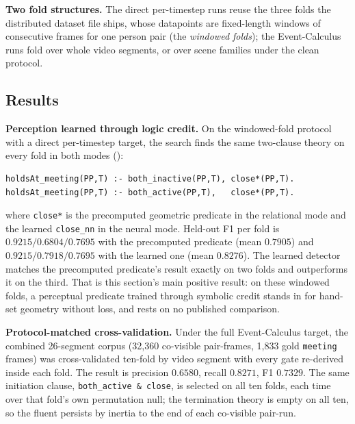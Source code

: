 \textbf{Two fold structures.} The direct per-timestep runs reuse the three folds the distributed dataset file ships, whose datapoints are fixed-length windows of consecutive frames for one person pair (the \emph{windowed folds}); the Event-Calculus runs fold over whole video segments, or over scene families under the clean protocol.

\subsection{Results}

\textbf{Perception learned through logic credit.} On the windowed-fold protocol with a direct per-timestep target, the search finds the same two-clause theory on every fold in both modes ():

\begin{lstlisting}[style=xlogstyle, basicstyle=\ttfamily\scriptsize,
                   caption={The two-clause theory the search returns on every
                            fold, in both the relational and the neural mode.},
                   label={lst:ec-theory}]
holdsAt_meeting(PP,T) :- both_inactive(PP,T), close*(PP,T).
holdsAt_meeting(PP,T) :- both_active(PP,T),   close*(PP,T).
\end{lstlisting}

\noindent where \texttt{close*} is the precomputed geometric predicate in the relational mode and the learned \texttt{close\_nn} in the neural mode. Held-out F1 per fold is $0.9215 / 0.6804 / 0.7695$ with the precomputed predicate (mean $0.7905$) and $0.9215 / 0.7918 / 0.7695$ with the learned one (mean $0.8276$). The learned detector matches the precomputed predicate's result exactly on two folds and outperforms it on the third. That is this section's main positive result: on these windowed folds, a perceptual predicate trained through symbolic credit stands in for hand-set geometry without loss, and rests on no published comparison.

\textbf{Protocol-matched cross-validation.} Under the full Event-Calculus target, the combined 26-segment corpus (32{,}360 co-visible pair-frames, 1{,}833 gold \texttt{meeting} frames) was cross-validated ten-fold by video segment with every gate re-derived inside each fold. The result is precision $0.6580$, recall $0.8271$, F1 $0.7329$. The same initiation clause, \texttt{both\_active \& close}, is selected on all ten folds, each time over that fold's own permutation null; the termination theory is empty on all ten, so the fluent persists by inertia to the end of each co-visible pair-run.

